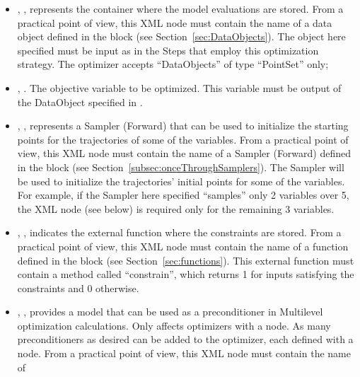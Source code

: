 \begin{itemize}
\item {}, ,
        represents the container where the model evaluations are stored.
        From a practical point of view, this XML node must contain the name of
        a data object defined in the  block (see
        Section~\ref{sec:DataObjects}). The object here specified must be
        input as   in the Steps that employ this optimization strategy.
        The  optimizer accepts ``DataObjects'' of type ``PointSet'' only;
        \item {}, . The objective variable to be optimized. This variable must be
          output of the DataObject specified in .
\item {}, ,
        represents a Sampler (Forward) that can be used to initialize the starting points for the trajectories of some of the variables.
        From a practical point of view, this XML node must contain the name of
        a Sampler (Forward) defined in the  block (see
        Section~\ref{subsec:onceThroughSamplers}). The Sampler will be used to initialize the trajectories' initial points for some
        of the variables. For example, if the Sampler here specified ``samples'' only 2 variables over 5, the   XML node (see below) is required
        only for the remaining 3 variables.
\item {}, ,
        indicates the external function where the constraints are stored. From a practical point of view, this XML node must contain the
        name of a function defined in the  block (see Section~\ref{sec:functions}). This external function must
        contain a method called ``constrain'', which returns 1 for inputs satisfying the constraints and 0 otherwise.
\item {}, ,
        provides a model that can be used as a preconditioner in Multilevel optimization
        calculations.  Only
        affects optimizers with a  node.  As many preconditioners as
        desired can be added
        to the optimizer, each defined with a  node.
        From a practical point of view, this XML node must contain the name of

\end{itemize}
